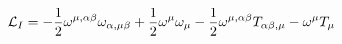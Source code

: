 \begin{equation}
{\cal L}_I = - \frac{1}{2} \omega^{\mu,\alpha\beta}
\omega_{\alpha,\mu\beta} + \frac{1}{2} \omega^\mu \omega_\mu -
\frac{1}{2} \omega^{\mu,\alpha\beta} T_{\alpha\beta,\mu} - \omega^\mu
T_\mu \label{eq2}
\end{equation}

